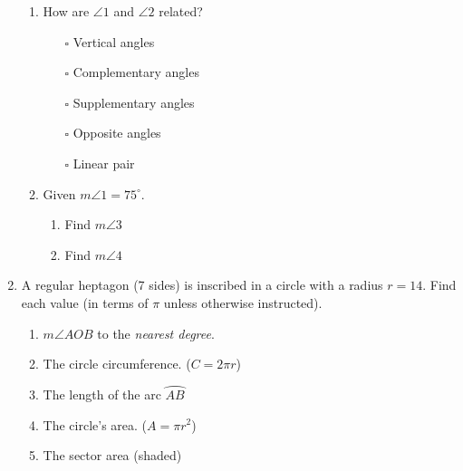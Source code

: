 \begin{enumerate}
  \begin{multicols}{2}  
    \begin{enumerate}
      \item How are $\angle 1$ and $\angle 2$ related?
        \begin{itemize}
          \item[$\square$] Vertical angles
          \item[$\square$] Complementary angles
          \item[$\square$] Supplementary angles
          \item[$\square$] Opposite angles
          \item[$\square$] Linear pair
        \end{itemize}
      \item Given $m\angle 1 = 75^\circ$.
        \begin{enumerate}
          \item Find $m\angle 3$ \vspace{0.5cm}
          \item Find $m\angle 4$ \vspace{2cm}
        \end{enumerate} 
        \end{enumerate}
  \end{multicols}
  
\item A regular heptagon (7 sides) is inscribed in a circle with a radius $r=14$. Find each value (in terms of $\pi$ unless otherwise instructed).
  \begin{multicols}{2}
  \raggedcolumns
  \begin{enumerate}[itemsep=1.1cm]
    \item $m \angle AOB$ to the \emph{nearest degree}.
    \item The circle circumference. ($C=2\pi r$)
    \item The length of the arc $\wideparen{AB}$
    \item The circle's area. ($A=\pi r^2$)
    \item The sector area (shaded)
  \end{enumerate}
  \end{multicols}


\end{enumerate}
